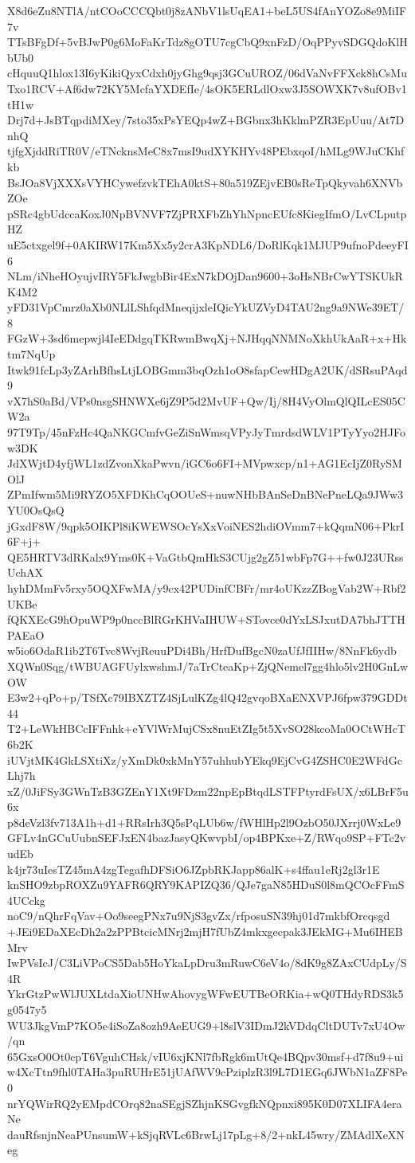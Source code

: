 X8d6eZu8NTlA/ntCOoCCCQbt0j8zANbV1lsUqEA1+beL5US4fAnYOZo8e9MiIF7v
TTsBFgDf+5vBJwP0g6MoFaKrTdz8gOTU7cgCbQ9xnFzD/OqPPyvSDGQdoKlHbUb0
cHquuQ1hlox13I6yKikiQyxCdxh0jyGhg9qsj3GCuUROZ/06dVaNvFFXck8hCsMu
Txo1RCV+Af6dw72KY5McfaYXDEfIe/4sOK5ERLdlOxw3J5SOWXK7v8ufOBv1tH1w
Drj7d+JsBTqpdiMXey/7sto35xPsYEQp4wZ+BGbnx3hKklmPZR3EpUuu/At7DnhQ
tjfgXjddRiTR0V/eTNcknsMeC8x7msI9udXYKHYv48PEbxqoI/hMLg9WJuCKhfkb
BsJOa8VjXXXsVYHCywefzvkTEhA0ktS+80a519ZEjvEB0sReTpQkyvah6XNVbZOe
pSRc4gbUdccaKoxJ0NpBVNVF7ZjPRXFbZhYhNpncEUfc8KiegIfmO/LvCLputpHZ
uE5ctxgel9f+0AKIRW17Km5Xx5y2crA3KpNDL6/DoRlKqk1MJUP9ufnoPdeeyFI6
NLm/iNheHOyujvIRY5FkJwgbBir4ExN7kDOjDan9600+3oHsNBrCwYTSKUkRK4M2
yFD31VpCmrz0aXb0NLlLShfqdMneqijxleIQicYkUZVyD4TAU2ng9a9NWe39ET/8
FGzW+3sd6mepwjl4IeEDdgqTKRwmBwqXj+NJHqqNNMNoXkhUkAaR+x+Hktm7NqUp
Itwk91fcLp3yZArhBfhsLtjLOBGmm3bqOzh1oO8sfapCewHDgA2UK/dSRsuPAqd9
vX7hS0aBd/VPs0nsgSHNWXe6jZ9P5d2MvUF+Qw/Ij/8H4VyOlmQlQILcES05CW2a
97T9Tp/45nFzHc4QaNKGCmfvGeZiSnWmsqVPyJyTmrdsdWLV1PTyYyo2HJFow3DK
JdXWjtD4yfjWL1zdZvonXkaPwvn/iGC6o6FI+MVpwxcp/n1+AG1EcIjZ0RySMOlJ
ZPmIfwm5Mi9RYZO5XFDKhCqOOUeS+nuwNHbBAnSeDnBNePneLQa9JWw3YU0OsQsQ
jGxdF8W/9qpk5OIKPl8iKWEWSOcYsXxVoiNES2hdiOVmm7+kQqmN06+PkrI6F+j+
QE5HRTV3dRKalx9Yms0K+VaGtbQmHkS3CUjg2gZ51wbFp7G++fw0J23URssUchAX
hyhDMmFv5rxy5OQXFwMA/y9cx42PUDinfCBFr/mr4oUKzzZBogVab2W+Rbf2UKBe
fQKXEcG9hOpuWP9p0nccBlRGrKHVaIHUW+STovce0dYxLSJxutDA7bhJTTHPAEaO
w5io6OdaR1ib2T6Tvc8WvjReuuPDi4Bh/HrfDufBgcN0zaUfJfIIHw/8NnFk6ydb
XQWn0Sqg/tWBUAGFUylxwshmJ/7aTrCteaKp+ZjQNemel7gg4hlo5lv2H0GnLwOW
E3w2+qPo+p/TSfXc79IBXZTZ4SjLulKZg4lQ42gvqoBXaENXVPJ6fpw379GDDt44
T2+LeWkHBCcIFFnhk+eYVlWrMujCSx8nuEtZIg5t5XvSO28kcoMa0OCtWHcT6b2K
iUVjtMK4GkLSXtiXz/yXmDk0xkMnY57uhhubYEkq9EjCvG4ZSHC0E2WFdGcLhj7h
xZ/0JiFSy3GWnTzB3GZEnY1Xt9FDzm22npEpBtqdLSTFPtyrdFsUX/x6LBrF5u6x
p8deVzl3fv713A1h+d1+RRsIrh3Q5sPqLUb6w/fWHlHp2l9OzbO50JXrrj0WxLe9
GFLv4nGCuUubnSEFJxEN4bazJasyQKwvpbI/op4BPKxe+Z/RWqo9SP+FTc2vudEb
k4jr73uIesTZ45mA4zgTegafhDFSiO6JZpbRKJapp86alK+s4ffau1eRj2gl3r1E
knSHO9zbpROXZu9YAFR6QRY9KAPIZQ36/QJe7gaN85HDuS0l8mQCOcFFmS4UCckg
noC9/nQhrFqVav+Oo9seegPNx7u9NjS3gvZx/rfposuSN39hj01d7mkbfOrcqsgd
+JEi9EDaXEcDh2a2zPPBtcicMNrj2mjH7fUbZ4mkxgecpak3JEkMG+Mu6IHEBMrv
IwPVsIcJ/C3LiVPoCS5Dab5HoYkaLpDru3mRuwC6eV4o/8dK9g8ZAxCUdpLy/S4R
YkrGtzPwWlJUXLtdaXioUNHwAhovygWFwEUTBeORKia+wQ0THdyRDS3k5g0547y5
WU3JkgVmP7KO5e4iSoZa8ozh9AeEUG9+l8slV3IDmJ2kVDdqCltDUTv7xU4Ow/qn
65GxsO0Ot0cpT6VguhCHsk/vIU6xjKNl7fbRgk6mUtQe4BQpv30msf+d7f8u9+ui
w4XcTtn9fhl0TAHa3puRUHrE51jUAfWV9cPziplzR3l9L7D1EGq6JWbN1aZF8Pe0
nrYQWirRQ2yEMpdCOrq82naSEgjSZhjnKSGvgfkNQpnxi895K0D07XLIFA4eraNe
dauRfsnjnNeaPUnsumW+kSjqRVLc6BrwLj17pLg+8/2+nkL45wry/ZMAdlXeXNeg
